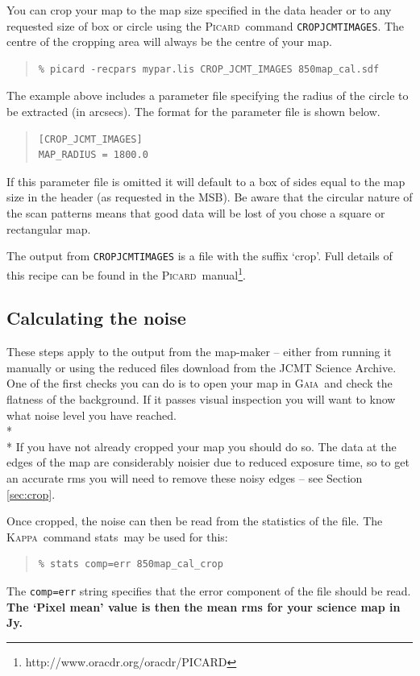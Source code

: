 \documentclass[twoside,11pt]{article}
\newcounter{box}
\newcommand{\xref}[3]{#1}
\newcommand{\xlabel}[1]{}
\renewcommand{\_}{\texttt{\symbol{95}}}
\newenvironment{myquote}{\begin{quote}\begin{small}}{\end{small}\end{quote}}
\newcommand{\Kappa}{\xref{\textsc{Kappa}}{sun95}{}}
\newcommand{\gaia}{\xref{\textsc{Gaia}}{sun214}{}}
\newcommand{\picard}{\xref{\textsc{Picard}}{sun231}{}}
\newcommand{\task}[1]{\textsf{#1}}
\newcommand{\param}[1]{\texttt{#1}}
\newcommand{\stats}{\xref{\task{stats}}{sun95}{STATS}}
\begin{document}
You can crop your map to the  map size specified in the data header or to any requested size of box or circle  using the \picard\ command \param{CROP\_JCMT\_IMAGES}. The centre of the cropping area will always be the centre of your map.
\begin{myquote}
\begin{verbatim}
% picard -recpars mypar.lis CROP_JCMT_IMAGES 850map_cal.sdf
\end{verbatim}
\end{myquote}
The example above includes a parameter file specifying the radius of the circle to be extracted (in arcsecs).  The format for the parameter file is shown below.
\begin{myquote}
\begin{verbatim}
[CROP_JCMT_IMAGES]
MAP_RADIUS = 1800.0
\end{verbatim}
\end{myquote}
If this parameter file is omitted it will default to a box of sides equal to the map size in the header (as requested in the MSB). Be aware that the circular nature of the scan patterns means that good data will be lost of you chose a square or rectangular map.

The output from \param{CROP\_JCMT\_IMAGES} is a file with the suffix `\_crop'. Full details of this recipe can be found in the \picard\ manual\footnote{http://www.oracdr.org/oracdr/PICARD}. 

\subsection{\xlabel{noise}Calculating the noise}
These steps apply to the output from the map-maker -- either from running it manually or using the reduced files download from the JCMT Science Archive. One of the first checks you can do is to open your map in \gaia\ and check the flatness of the background. If it passes visual inspection you will want to know what noise level you have reached.
\\*\\*
If you have not already cropped your map you should do so. The data at the edges of the map are considerably noisier due to reduced exposure time, so to get an accurate rms you will need to remove these noisy edges -- see Section \ref{sec:crop}. 

Once cropped, the noise can then be read from the statistics of the file. The \Kappa\ command \stats\ may be used for this:
\begin{myquote}
\begin{verbatim}
% stats comp=err 850map_cal_crop
\end{verbatim}
\end{myquote}
The \param{comp=err} string specifies that the error component of the file should be read. \textbf{The `Pixel mean' value is then the mean rms for your science map in Jy.}
\end{document}
